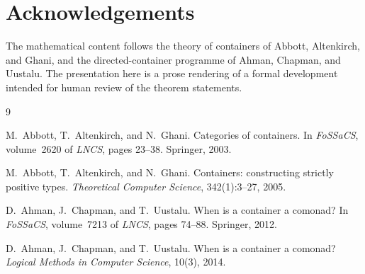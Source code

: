 \documentclass[11pt,a4paper]{article}
\theoremstyle{plain}
\theoremstyle{definition}
\begin{document}
\section*{Acknowledgements}

The mathematical content follows the theory of containers of Abbott,
Altenkirch, and Ghani, and the directed-container programme of Ahman, Chapman,
and Uustalu. The presentation here is a prose rendering of a formal
development intended for human review of the theorem statements.

\begin{thebibliography}{9}

M.~Abbott, T.~Altenkirch, and N.~Ghani.
\newblock Categories of containers.
\newblock In \emph{FoSSaCS}, volume~2620 of \emph{LNCS}, pages 23--38.
\newblock Springer, 2003.

M.~Abbott, T.~Altenkirch, and N.~Ghani.
\newblock Containers: constructing strictly positive types.
\newblock \emph{Theoretical Computer Science}, 342(1):3--27, 2005.

D.~Ahman, J.~Chapman, and T.~Uustalu.
\newblock When is a container a comonad?
\newblock In \emph{FoSSaCS}, volume~7213 of \emph{LNCS}, pages 74--88.
\newblock Springer, 2012.

D.~Ahman, J.~Chapman, and T.~Uustalu.
\newblock When is a container a comonad?
\newblock \emph{Logical Methods in Computer Science}, 10(3), 2014.

\end{thebibliography}
\end{document}
